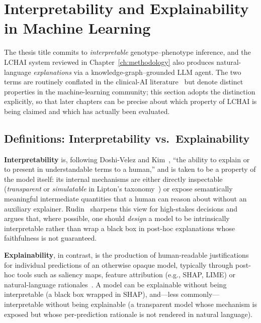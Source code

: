 \section{Interpretability and Explainability in Machine Learning}
\label{sec:bg:xai}

The thesis title commits to \emph{interpretable} genotype--phenotype
inference, and the LCHAI system reviewed in
Chapter~\ref{ch:methodology} also produces natural-language
\emph{explanations} via a knowledge-graph--grounded LLM agent.
The two terms are routinely conflated in the clinical-AI
literature~\cite{tjoa2021survey} but denote distinct properties in
the machine-learning community; this section adopts the
distinction explicitly, so that later chapters can be precise
about which property of LCHAI is being claimed and which has
actually been evaluated.

\subsection{Definitions: Interpretability vs.\ Explainability}
\label{sec:bg:xai:definitions}

\textbf{Interpretability} is, following Doshi-Velez and
Kim~\cite{doshivelez2017rigorous}, ``the ability to explain or
to present in understandable terms to a human,'' and is taken to
be a property of the model itself: its internal mechanisms are
either directly inspectable (\emph{transparent} or
\emph{simulatable} in Lipton's
taxonomy~\cite{lipton2018mythos}) or expose semantically
meaningful intermediate quantities that a human can reason about
without an auxiliary explainer.
Rudin~\cite{rudin2019stop} sharpens this view for high-stakes
decisions and argues that, where possible, one should
\emph{design} a model to be intrinsically interpretable rather
than wrap a black box in post-hoc explanations whose faithfulness
is not guaranteed.

\textbf{Explainability}, in contrast, is the production of
human-readable justifications for individual predictions of an
otherwise opaque model, typically through post-hoc tools such as
saliency maps, feature attribution (e.g., SHAP, LIME) or
natural-language rationales~\cite{gilpin2018explaining,arrieta2020xai}.
A model can be explainable without being interpretable (a black
box wrapped in SHAP), and---less commonly---interpretable without
being explainable (a transparent model whose mechanism is exposed
but whose per-prediction rationale is not rendered in natural
language).

